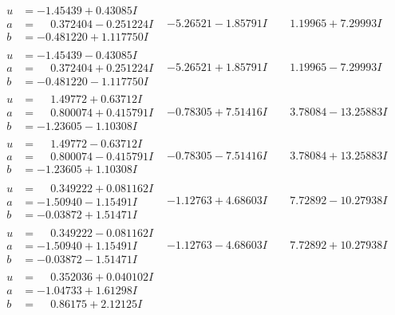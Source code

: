 \documentclass[1p]{elsarticle_modified}
\theoremstyle{definition}
\begin{document}
$$\begin{array}{c|c|c}
\begin{aligned}
u &= -1.45439 + 0.43085 I \\
a &= \phantom{-}0.372404 - 0.251224 I \\
b &= -0.481220 + 1.117750 I\end{aligned}
 & -5.26521 - 1.85791 I & \phantom{-}1.19965 + 7.29993 I \\ \hline\begin{aligned}
u &= -1.45439 - 0.43085 I \\
a &= \phantom{-}0.372404 + 0.251224 I \\
b &= -0.481220 - 1.117750 I\end{aligned}
 & -5.26521 + 1.85791 I & \phantom{-}1.19965 - 7.29993 I \\ \hline\begin{aligned}
u &= \phantom{-}1.49772 + 0.63712 I \\
a &= \phantom{-}0.800074 + 0.415791 I \\
b &= -1.23605 - 1.10308 I\end{aligned}
 & -0.78305 + 7.51416 I & \phantom{-}3.78084 - 13.25883 I \\ \hline\begin{aligned}
u &= \phantom{-}1.49772 - 0.63712 I \\
a &= \phantom{-}0.800074 - 0.415791 I \\
b &= -1.23605 + 1.10308 I\end{aligned}
 & -0.78305 - 7.51416 I & \phantom{-}3.78084 + 13.25883 I \\ \hline\begin{aligned}
u &= \phantom{-}0.349222 + 0.081162 I \\
a &= -1.50940 - 1.15491 I \\
b &= -0.03872 + 1.51471 I\end{aligned}
 & -1.12763 + 4.68603 I & \phantom{-}7.72892 - 10.27938 I \\ \hline\begin{aligned}
u &= \phantom{-}0.349222 - 0.081162 I \\
a &= -1.50940 + 1.15491 I \\
b &= -0.03872 - 1.51471 I\end{aligned}
 & -1.12763 - 4.68603 I & \phantom{-}7.72892 + 10.27938 I \\ \hline\begin{aligned}
u &= \phantom{-}0.352036 + 0.040102 I \\
a &= -1.04733 + 1.61298 I \\
b &= \phantom{-}0.86175 + 2.12125 I\end{aligned}

\end{array}$$
\end{document}
